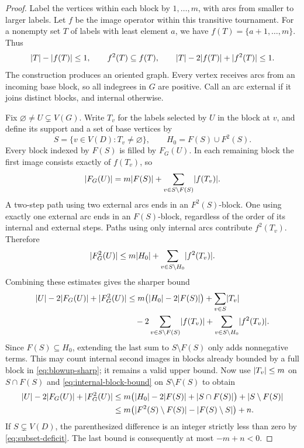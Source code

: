 \begin{proof}
Label the vertices within each block by $1,\ldots,m$, with arcs from
smaller to larger labels.  Let $f$ be the image operator within this
transitive tournament.  For a nonempty set $T$ of labels with least
element $a$, we have $f(T)=\{a+1,\ldots,m\}$.  Thus
\begin{equation}
\label{eq:internal-block-bound}
  \lvert T\rvert-\lvert f(T)\rvert\le1,\qquad
  f^2(T)\subseteq f(T),\qquad
  \lvert T\rvert-2\lvert f(T)\rvert+\lvert f^2(T)\rvert\le1.
\end{equation}
The construction produces an oriented graph.  Every vertex receives
arcs from an incoming base block, so all indegrees in $G$ are positive.
Call an arc external if it joins distinct blocks, and internal otherwise.

Fix $\varnothing\ne U\subsetneq V(G)$.  Write $T_v$ for the labels
selected by $U$ in the block at $v$, and define its support and a set
of base vertices by
\[
  S=\{v\in V(D):T_v\ne\varnothing\},\qquad
  H_0=F(S)\cup F^2(S).
\]
Every block indexed by $F(S)$ is filled by $F_G(U)$.  In each remaining
block the first image consists exactly of $f(T_v)$, so
\[
  \lvert F_G(U)\rvert=m\lvert F(S)\rvert
     +\sum_{v\in S\setminus F(S)}\lvert f(T_v)\rvert.
\]
A two-step path using two external arcs ends in an $F^2(S)$-block.
One using exactly one external arc ends in an $F(S)$-block, regardless
of the order of its internal and external steps.  Paths using only
internal arcs contribute $f^2(T_v)$.  Therefore
\[
  \lvert F_G^2(U)\rvert\le m\lvert H_0\rvert
     +\sum_{v\in S\setminus H_0}\lvert f^2(T_v)\rvert.
\]
Combining these estimates gives the sharper bound
\begin{align}
\label{eq:blowup-sharp}
  \lvert U\rvert-2\lvert F_G(U)\rvert+\lvert F_G^2(U)\rvert
  &\le m\bigl(\lvert H_0\rvert-2\lvert F(S)\rvert\bigr)
       +\sum_{v\in S}\lvert T_v\rvert \notag\\
  &\quad -2\sum_{v\in S\setminus F(S)}\lvert f(T_v)\rvert
       +\sum_{v\in S\setminus H_0}\lvert f^2(T_v)\rvert.
\end{align}
Since $F(S)\subseteq H_0$, extending the last sum to
$S\setminus F(S)$ only adds nonnegative terms.  This may count internal
second images in blocks already bounded by a full block in
\eqref{eq:blowup-sharp}; it remains a valid upper bound.  Now use
$\lvert T_v\rvert\le m$ on $S\cap F(S)$ and
\eqref{eq:internal-block-bound} on $S\setminus F(S)$ to obtain
\begin{align*}
  \lvert U\rvert-2\lvert F_G(U)\rvert+\lvert F_G^2(U)\rvert
  &\le m\bigl(\lvert H_0\rvert-2\lvert F(S)\rvert
                    +\lvert S\cap F(S)\rvert\bigr)
       +\lvert S\setminus F(S)\rvert\\
  &\le m\bigl(\lvert F^2(S)\setminus F(S)\rvert
                    -\lvert F(S)\setminus S\rvert\bigr)+n.
\end{align*}
If $S\subsetneq V(D)$, the parenthesized difference is an integer
strictly less than zero by \eqref{eq:subset-deficit}.  The last bound
is consequently at most $-m+n<0$.


\end{proof}

